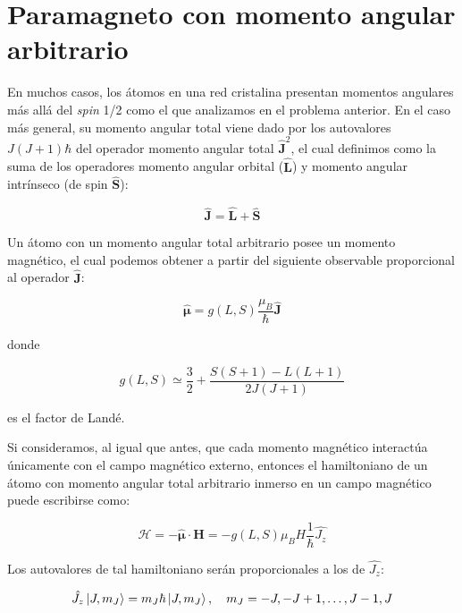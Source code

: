 \documentclass[a4paper,11pt]{article}
\begin{document}
\section{Paramagneto con momento angular arbitrario}

En muchos casos, los átomos en una red cristalina presentan momentos 
angulares más allá del \emph{spin} 1/2 como el que analizamos en el 
problema anterior. En el caso más general, su momento angular total 
viene dado por los autovalores $J(J+1)\hbar$ del operador momento 
angular total $\hat{\textbf{J}}^2$, el cual definimos como la suma de los 
operadores momento angular orbital ($\hat{\textbf{L}}$) y momento 
angular intrínseco (de spin $\hat{\textbf{S}}$):

$$ \hat{\textbf{J}} = \hat{\textbf{L}} + \hat{\textbf{S}} $$

Un átomo con un momento angular total arbitrario posee un momento 
magnético, el cual podemos obtener a partir del siguiente observable 
proporcional al operador $\hat{\textbf{J}}$:

$$ \hat{\boldsymbol{\mu}} =
g(L, S) \frac{\mu_B}{\hbar} \hat{\textbf{J}} $$

\noindent donde

$$ g(L,S) \simeq \frac{3}{2} + \frac{S(S+1) - L(L+1)}{2J(J+1)} $$

\noindent es el factor de Landé.

Si consideramos, al igual que antes, que cada momento magnético 
interactúa únicamente con el campo magnético externo, entonces el 
hamiltoniano de un átomo con momento angular total arbitrario inmerso en un 
campo magnético puede escribirse como:

$$ \hat{\mathcal{H}} = - \hat{\boldsymbol{\mu}} \cdot \textbf{H} = 
- g(L, S) \mu_B H \frac{1}{\hbar}\hat{J_z} $$

Los autovalores de tal hamiltoniano serán proporcionales a los de 
$\hat{J_z}$:

$$ \hat{J_z} \Ket{J, m_J} = m_J \hbar \Ket{J, m_J}, \quad
m_J = -J, -J + 1, \dots, J - 1, J $$
\end{document}
